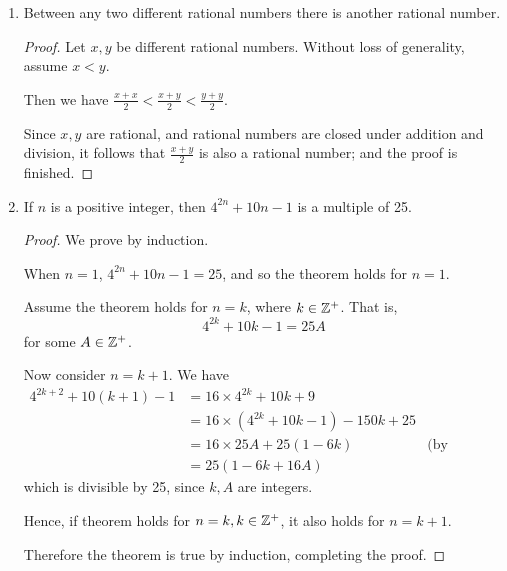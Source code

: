 \begin{enumerate}
\item
    \begin{theorem}
        Between any two different rational numbers there is another
        rational number.
    \end{theorem}
    \begin{proof}
        Let $x, y$ be different rational numbers.
        Without loss of generality, assume $x < y$.

        Then we have $\frac{x+x}{2} < \frac{x+y}{2} < \frac{y+y}{2}$.

        Since $x, y$ are rational, and rational numbers are closed under
        addition and division, it follows that $\frac{x+y}{2}$ is also a
        rational number; and the proof is finished.
    \end{proof}

\item
    \begin{theorem}
        If $n$ is a positive integer, then $4^{2n} + 10n - 1$ is a
        multiple of 25.
    \end{theorem}
    \begin{proof}
        We prove by induction.

        When $n = 1$, $4^{2n} + 10n - 1 = 25$, and so the theorem holds for
        $n = 1$.

        Assume the theorem holds for $n = k$, where $k \in \mathbb{Z}^+$.
        That is,
        $$4^{2k} + 10k - 1 = 25A$$
        for some $A \in \mathbb{Z}^+$.

        Now consider $n = k+1$.
        We have
        \begin{align*}
            4^{2k+2} + 10(k+1) - 1 &= 16 \times 4^{2k} + 10k + 9 \\
            &= 16 \times (4^{2k} + 10k - 1) - 150k + 25 \\
            &= 16 \times 25A + 25(1 - 6k) & \textrm{(by assumption)} \\
            &= 25(1 - 6k + 16A)
        \end{align*}
        which is divisible by 25, since $k, A$ are integers.

        Hence, if theorem holds for $n=k, k \in \mathbb{Z}^+$, it also holds for
        $n = k+1$.

        Therefore the theorem is true by induction, completing the proof.
    \end{proof}
\end{enumerate}
